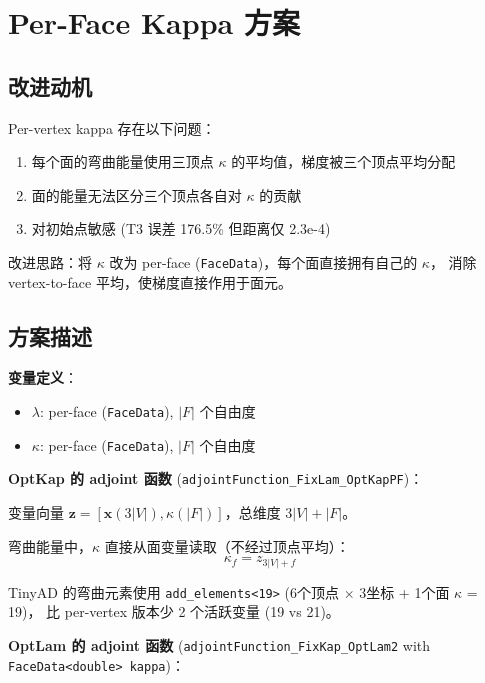 \documentclass[12pt,a4paper]{article}
\begin{document}
\section{Per-Face Kappa 方案}

\subsection{改进动机}

Per-vertex kappa 存在以下问题：
\begin{enumerate}
    \item 每个面的弯曲能量使用三顶点 $\kappa$ 的平均值，梯度被三个顶点平均分配
    \item 面的能量无法区分三个顶点各自对 $\kappa$ 的贡献
    \item 对初始点敏感 (T3 误差 176.5\% 但距离仅 2.3e-4)
\end{enumerate}

改进思路：将 $\kappa$ 改为 per-face (\texttt{FaceData})，每个面直接拥有自己的 $\kappa$，
消除 vertex-to-face 平均，使梯度直接作用于面元。

\subsection{方案描述}

\textbf{变量定义}：
\begin{itemize}
    \item $\lambda$: per-face (\texttt{FaceData}), $|F|$ 个自由度
    \item $\kappa$: per-face (\texttt{FaceData}), $|F|$ 个自由度
\end{itemize}

\textbf{OptKap 的 adjoint 函数}
(\texttt{adjointFunction\_FixLam\_OptKapPF})：

变量向量 $\mathbf{z} = [\mathbf{x}(3|V|), \kappa(|F|)]$，总维度 $3|V| + |F|$。

弯曲能量中，$\kappa$ 直接从面变量读取（不经过顶点平均）：
\begin{equation}
    \kappa_f = z_{3|V| + f}
\end{equation}

TinyAD 的弯曲元素使用 \texttt{add\_elements<19>}
(6个顶点 $\times$ 3坐标 + 1个面 $\kappa$ = 19)，
比 per-vertex 版本少 2 个活跃变量 (19 vs 21)。

\textbf{OptLam 的 adjoint 函数}
(\texttt{adjointFunction\_FixKap\_OptLam2} with \texttt{FaceData<double> kappa})：
\end{document}
